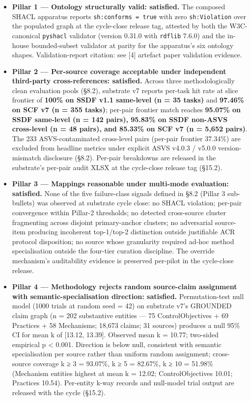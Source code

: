 \documentclass[
]{article}
\providecommand{\tightlist}{%
  \setlength{\itemsep}{0pt}\setlength{\parskip}{0pt}}
\begin{document}
\begin{itemize}
\tightlist
\item
  \textbf{Pillar 1 --- Ontology structurally valid: satisfied.} The
  composed SHACL apparatus reports \texttt{sh:conforms\ =\ true} with
  zero \texttt{sh:Violation} over the populated graph at the cycle-close
  release tag, attested by both the W3C-canonical \texttt{pyshacl}
  validator (version 0.31.0 with \texttt{rdflib} 7.6.0) and the in-house
  bounded-subset validator at parity for the apparatus's six ontology
  shapes. Validation-report citation: see {[}4{]} artefact paper
  validation evidence.
\item
  \textbf{Pillar 2 --- Per-source coverage acceptable under independent
  third-party cross-references: satisfied.} Across three
  methodologically clean evaluation pools (§8.2), substrate v7 reports
  per-task hit rate at slice frontier of \textbf{100\% on SSDF v1.1
  same-level (n = 35 tasks)} and \textbf{97.46\% on SCF v7 (n = 355
  tasks)}; per-pair frontier match reaches \textbf{95.07\% on SSDF
  same-level (n = 142 pairs), 95.83\% on SSDF non-ASVS cross-level (n =
  48 pairs), and 85.33\% on SCF v7 (n = 5,652 pairs)}. The 233
  ASVS-contaminated cross-level pairs (per-pair frontier 37.34\%) are
  excluded from headline metrics under explicit ASVS v4.0.3 / v5.0.0
  version-mismatch disclosure (§8.2). Per-pair breakdowns are released
  in the substrate's per-pair audit XLSX at the cycle-close release tag
  (§15.2).
\item
  \textbf{Pillar 3 --- Mappings reasonable under multi-mode evaluation:
  satisfied.} None of the five failure-class signals defined in §8.2
  (Pillar 3 sub-bullets) was observed at substrate cycle close: no SHACL
  violation; per-pair convergence within Pillar-2 thresholds; no
  detected cross-source cluster fragmenting across disjoint
  primary-anchor clusters; no adversarial source-item producing
  incoherent top-1/top-2 distinction outside justifiable ACR protocol
  disposition; no source whose granularity required ad-hoc method
  specialisation outside the four-tier curation discipline. The override
  mechanism's auditability evidence is preserved per-pilot in the
  cycle-close release.
\item
  \textbf{Pillar 4 --- Methodology rejects random source-claim
  assignment with semantic-specialisation direction: satisfied.}
  Permutation-test null model (1000 trials at random seed = 42) on
  substrate v7's GROUNDED claim graph (n = 202 substantive entities ---
  75 ControlObjectives + 69 Practices + 58 Mechanisms; 18,673 claims; 31
  sources) produces a null 95\% CI for mean k of {[}13.12, 13.39{]}.
  Observed mean k = 10.77; two-sided empirical p \textless{} 0.001.
  Direction is below null, consistent with semantic specialisation per
  source rather than uniform random assignment; cross-source coverage k
  ≥ 3 = 93.07\%, k ≥ 5 = 82.67\%, k ≥ 10 = 51.98\% (Mechanism entities
  highest at mean k = 12.02; ControlObjectives 10.01; Practices 10.54).
  Per-entity k-way records and null-model trial output are released with
  the cycle (§15.2).
\end{itemize}
\end{document}
